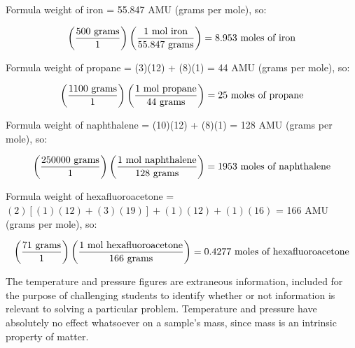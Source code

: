 





\noindent
Formula weight of iron = 55.847 AMU (grams per mole), so:

$$\left(500 \hbox{ grams} \over 1 \right) \left(1 \hbox{ mol iron} \over 55.847 \hbox{ grams}\right) = 8.953 \hbox{ moles of iron}$$

\vskip 10pt

\noindent
Formula weight of propane = (3)(12) + (8)(1) = 44 AMU (grams per mole), so:

$$\left(1100 \hbox{ grams} \over 1 \right) \left(1 \hbox{ mol propane} \over 44 \hbox{ grams}\right) = 25 \hbox{ moles of propane}$$

\vskip 10pt

\noindent
Formula weight of naphthalene = (10)(12) + (8)(1) = 128 AMU (grams per mole), so:

$$\left(250000 \hbox{ grams} \over 1 \right) \left(1 \hbox{ mol naphthalene} \over 128 \hbox{ grams}\right) = 1953 \hbox{ moles of naphthalene}$$

\vskip 10pt

\noindent
Formula weight of hexafluoroacetone = $(2) \left[ (1)(12) + (3)(19) \right] + (1)(12) + (1)(16)$ = 166 AMU (grams per mole), so:

$$\left(71 \hbox{ grams} \over 1 \right) \left(1 \hbox{ mol hexafluoroacetone} \over 166 \hbox{ grams}\right) = 0.4277 \hbox{ moles of hexafluoroacetone}$$

\vskip 10pt

The temperature and pressure figures are extraneous information, included for the purpose of challenging students to identify whether or not information is relevant to solving a particular problem.  Temperature and pressure have absolutely no effect whatsoever on a sample's mass, since mass is an intrinsic property of matter.




